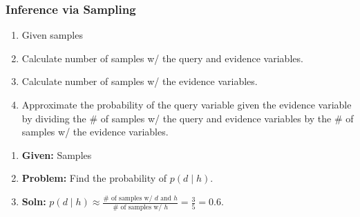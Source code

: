 \begin{example}
\end{example}
\newpage

\subsubsection{Inference via Sampling}
\begin{process}
    \begin{enumerate}
        \item Given samples 
        \item Calculate number of samples w/ the query and evidence variables.
        \item Calculate number of samples w/ the evidence variables.
        \item Approximate the probability of the query variable given the evidence variable by dividing the \# of samples w/ the query and evidence variables by the \# of samples w/ the evidence variables.
    \end{enumerate}
\end{process}

\begin{example}
    \begin{enumerate}
        \item \textbf{Given:} Samples 
        \item \textbf{Problem:} Find the probability of $p(d \mid h)$.
        \item \textbf{Soln:} $p(d \mid h) \approx \frac{\# \text{ of samples w/ } d \text{ and } h}{\# \text{ of samples w/ } h} = \frac{3}{5} = 0.6$.
    \end{enumerate}
\end{example}